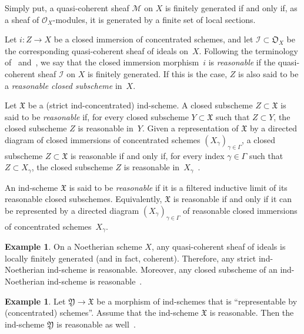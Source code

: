 \documentclass[12pt,a4paper]{amsart}
\newcommand{\+}{\protect\nobreakdash-}
\renewcommand{\:}{\colon}
\newcommand{\rarrow}{\longrightarrow}
\newcommand{\cO}{\mathcal O}
\newcommand{\cM}{\mathcal M}
\newcommand{\cI}{\mathcal I}
\newcommand{\fX}{\mathfrak X}
\newcommand{\fY}{\mathfrak Y}
\newcommand{\fO}{\mathfrak O}
\theoremstyle{plain}
\theoremstyle{definition}
\newtheorem{ex}[thm]{Example}
\begin{document}
 Simply put, a quasi-coherent sheaf $\cM$ on $X$ is finitely
generated if and only if, as a sheaf of $\cO_X$\+modules, it is
generated by a finite set of local sections.

 Let $i\:Z\rarrow X$ be a closed immersion of concentrated schemes,
and let $\cI\subset\fO_X$ be the corresponding quasi-coherent sheaf
of ideals on~$X$.
 Following the terminology of~\cite[Sections~7.11.1 and~7.11.4]{BD2}
and~\cite[Section~2.1]{Psemten}, we say that the closed immersion
morphism~$i$ is \emph{reasonable} if the quasi-coherent sheaf $\cI$
on $X$ is finitely generated.
 If this is the case, $Z$ is also said to be a \emph{reasonable closed
subscheme} in~$X$.

 Let $\fX$ be a (strict ind-concentrated) ind-scheme.
 A closed subscheme $Z\subset\fX$ is said to be \emph{reasonable} if,
for every closed subscheme $Y\subset\fX$ such that $Z\subset Y$,
the closed subscheme $Z$ is reasonable in~$Y$.
 Given a representation of $\fX$ by a directed diagram of closed
immersions of concentrated schemes $(X_\gamma)_{\gamma\in\Gamma}$,
a closed subscheme $Z\subset\fX$ is reasonable if and only if,
for every index $\gamma\in\Gamma$ such that $Z\subset X_\gamma$,
the closed subscheme $Z$ is reasonable in~$X_\gamma$
\,\cite[Section~2.1]{Psemten}.

 An ind-scheme $\fX$ is said to be \emph{reasonable} if it is
a filtered inductive limit of its reasonable closed subschemes.
 Equivalently, $\fX$ is reasonable if and only if it can be
represented by a directed diagram $(X_\gamma)_{\gamma\in\Gamma}$
of reasonable closed immersions of concentrated schemes~$X_\gamma$.

\begin{ex} \label{ind-noetherian-are-reasonable-example}
 On a Noetherian scheme $X$, any quasi-coherent sheaf of ideals is
locally finitely generated (and in fact, coherent).
 Therefore, any strict ind-Noetherian ind-scheme is reasonable.
 Moreover, any closed subscheme of an ind-Noetherian ind-scheme
is reasonable~\cite[Section~4.2]{Psemten}.
\end{ex}

\begin{ex} \label{repr-by-schemes-over-reasonable-example}
 Let $\fY\rarrow\fX$ be a morphism of ind-schemes that is
``representable by (concentrated) schemes''.
 Assume that the ind-scheme $\fX$ is reasonable.
 Then the ind-scheme $\fY$ is reasonable as
well~\cite[Section~2.1]{Psemten}.
\end{ex}
\end{document}
